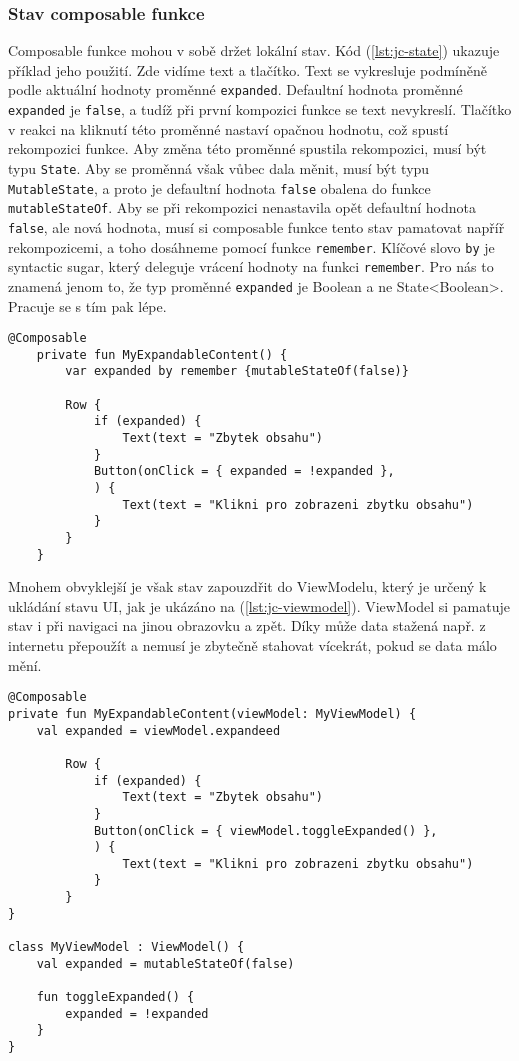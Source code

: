 \subsubsection*{Stav composable funkce}
Composable funkce mohou v sobě držet lokální stav. Kód (\ref{lst:jc-state}) ukazuje příklad jeho použití. Zde vidíme text a tlačítko. Text se vykresluje podmíněně podle aktuální hodnoty proměnné \lstinline|expanded|. Defaultní hodnota proměnné \lstinline|expanded| je \lstinline|false|, a tudíž při první kompozici funkce se text nevykreslí. Tlačítko v reakci na kliknutí této proměnné nastaví opačnou hodnotu, což spustí rekompozici funkce. Aby změna této proměnné spustila rekompozici, musí být typu \lstinline|State|. Aby se proměnná však vůbec dala měnit, musí být typu \lstinline|MutableState|, a proto je defaultní hodnota \lstinline|false| obalena do funkce \lstinline|mutableStateOf|. Aby se při rekompozici nenastavila opět defaultní hodnota \lstinline|false|, ale nová hodnota, musí si composable funkce tento stav pamatovat napříř rekompozicemi, a toho dosáhneme pomocí funkce \lstinline|remember|. Klíčové slovo \lstinline|by| je syntactic sugar, který deleguje vrácení hodnoty na funkci \lstinline|remember|. Pro nás to znamená jenom to, že typ proměnné \lstinline|expanded| je Boolean a ne State<Boolean>. Pracuje se s tím pak lépe. 

\begin{lstlisting}[caption={Příklad composable funkce používající lokální stav.}, label={lst:jc-state}, tabsize=2]
	@Composable
	private fun MyExpandableContent() {
		var expanded by remember {mutableStateOf(false)}
		
		Row {
			if (expanded) {
				Text(text = "Zbytek obsahu")
			}
			Button(onClick = { expanded = !expanded },
			) {
				Text(text = "Klikni pro zobrazeni zbytku obsahu")
			}
		}
	}
\end{lstlisting}

\noindent Mnohem obvyklejší je však stav zapouzdřit do ViewModelu, který je určený k ukládání stavu UI, jak je ukázáno na (\ref{lst:jc-viewmodel}). ViewModel si pamatuje stav i při navigaci na jinou obrazovku a zpět. Díky může data stažená např. z internetu přepoužít a nemusí je zbytečně stahovat vícekrát, pokud se data málo mění.

\begin{lstlisting}[caption={Příklad composable funkce používající stav z ViewModelu.}, label={lst:jc-viewmodel}, tabsize=2]
@Composable
private fun MyExpandableContent(viewModel: MyViewModel) {
    val expanded = viewModel.expandeed

		Row {
			if (expanded) {
				Text(text = "Zbytek obsahu")
			}
			Button(onClick = { viewModel.toggleExpanded() },
			) {
				Text(text = "Klikni pro zobrazeni zbytku obsahu")
			}
		}
}

class MyViewModel : ViewModel() {
	val expanded = mutableStateOf(false)
	
	fun toggleExpanded() {
		expanded = !expanded
	}
}
\end{lstlisting}

